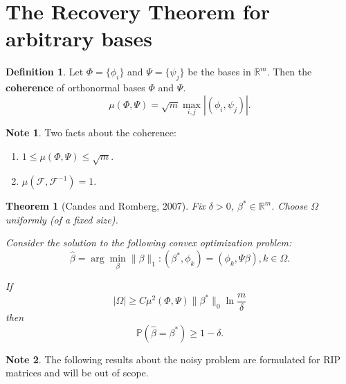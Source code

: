 \documentclass[11pt]{article}
\numberwithin{equation}{section}
\newtheorem{theorem}{Theorem}[section]
\theoremstyle{definition}
\newtheorem{remark}{Note}[section]
\newtheorem{definition}{Definition}[section]
\begin{document}
\section{The Recovery Theorem for arbitrary bases}

\begin{definition}
    Let $\Phi = \{\phi_i\}$ and $\Psi = \{\psi_j\}$ be the bases in $\mathbb R^m$.
    Then the \textbf{coherence} of orthonormal bases $\Phi$ and $\Psi$.
    $$ \mu(\Phi, \Psi) = \sqrt{m} \max_{i, j} |(\phi_i, \psi_j)|. $$
\end{definition}

\begin{remark}
    Two facts about the coherence:
    \begin{enumerate}
        \item $ 1 \leq \mu(\Phi, \Psi) \leq \sqrt m $.
        \item $\mu(\mathcal F, \mathcal F^{-1}) = 1$.
    \end{enumerate}
\end{remark}

\begin{theorem}[Candes and Romberg, 2007]
    Fix $\delta > 0$, $\beta^* \in \mathbb R^m$.
    Choose $\Omega$ uniformly (of a fixed size).

    Consider the solution to the following convex optimization problem:
    $$ \hat \beta = \arg \min_\beta \|\beta\|_1: (\beta^*, \phi_k) = (\phi_k, \Psi \beta), k \in \Omega. $$
    
    If
    $$ |\Omega| \ge C \mu^2(\Phi, \Psi) \|\beta^*\|_0 \ln \frac{m}{\delta} $$
    then
    $$ \mathbb P(\hat \beta = \beta^*) \ge 1 - \delta. $$
\end{theorem}

\begin{remark}
    The following results about the noisy problem are formulated for RIP matrices and will be out of scope.
\end{remark}
\end{document}
